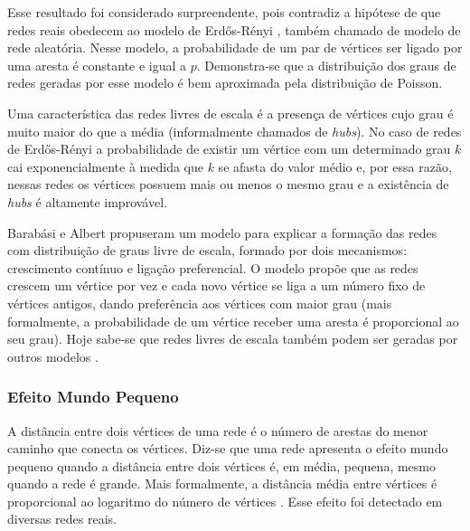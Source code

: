 \documentclass{article}
\begin{document}
Esse resultado foi considerado surpreendente, pois contradiz a hipótese de que redes reais obedecem ao modelo de Erdős-Rényi \cite{Erdos1959}, também chamado de modelo de rede aleatória. Nesse modelo, a probabilidade de um par de vértices ser ligado por uma aresta é constante e igual a $p$. Demonstra-se que a distribuição dos graus de redes geradas por esse modelo é bem aproximada pela distribuição de Poisson.

Uma característica das redes livres de escala é a presença de vértices cujo grau é muito maior do que a média (informalmente chamados de \textit{hubs}). No caso de redes de Erdős-Rényi a probabilidade de existir um vértice com um determinado grau $k$ cai exponencialmente à medida que $k$ se afasta do valor médio e, por essa razão, nessas redes os vértices possuem mais ou menos o mesmo grau e a existência de \textit{hubs} é altamente improvável.

Barabási e Albert propuseram um modelo para explicar a formação das redes com distribuição de graus livre de escala, formado por dois mecanismos: crescimento contínuo e ligação preferencial. O modelo propõe que as redes crescem um vértice por vez e cada novo vértice se liga a um número fixo de vértices antigos, dando preferência aos vértices com maior grau (mais formalmente, a probabilidade de um vértice receber uma aresta é proporcional ao seu grau). Hoje sabe-se que redes livres de escala também podem ser geradas por outros modelos \cite{Albert2000,Kumar2000,Aiello2000b,Dorogovtsev2002,Bollobas2003,Deo2005}.


\subsubsection{Efeito Mundo Pequeno}

A distância entre dois vértices de uma rede é o número de arestas do menor caminho que conecta os vértices. Diz-se que uma rede apresenta o efeito mundo pequeno quando a distância entre dois vértices é, em média, pequena, mesmo quando a rede é grande. Mais formalmente, a distância média entre vértices é proporcional ao logaritmo do número de vértices \cite{Watts1998}. Esse efeito foi detectado em diversas redes reais.
\end{document}
